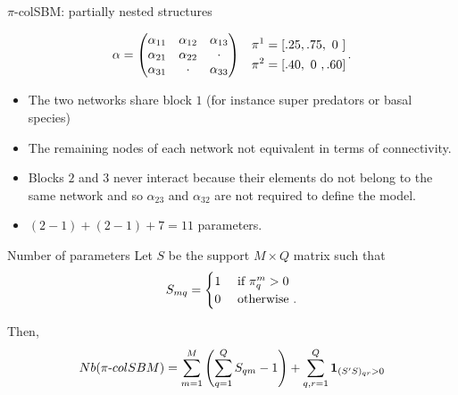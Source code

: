 \documentclass[compress,10pt]{beamer}
\begin{document}
\begin{frame}{$\pi$-colSBM: partially nested structures}

\begin{eqnarray*}
    \alpha = \begin{pmatrix}
      \alpha_{11} & \alpha_{12} & \alpha_{13} \\
      \alpha_{21} & \alpha_{22} & \cdot \\
      \alpha_{31} & \cdot & \alpha_{33}
    \end{pmatrix} & &  \begin{aligned}
                      \pi^{1} = [.25, .75, \text{ }0\text{ }] \\ \pi^{2} = [.40, \text{ }0\text{ }, .60]
                    \end{aligned}\, . 
\end{eqnarray*}
  
\begin{itemize}
 \item The two networks share block $1$ (for instance super predators or basal species)
 \item The remaining nodes of each network not equivalent in terms of connectivity.
 \item Blocks $2$ and $3$ never interact because their elements do not belong to the same network and so $\alpha_{23}$ and $\alpha_{32}$ are not required to define the model.
 \item $(2-1) + (2-1) + 7 = 11$ parameters. 
\end{itemize}
\end{frame}



\begin{frame}{Number of parameters}
Let $S$ be the support   $M\times Q$ matrix such that 
\begin{equation*}\label{eq:support}
  S_{mq} = \begin{cases}
             1 & \text{ if } \pi^{m}_q>0 \\
             0 & \text{ otherwise }.
           \end{cases}
\end{equation*}

Then, 
\begin{equation*}\label{eq:Nbpi}
Nb(\pi\text{-} colSBM) = \sum_{m=1}^M \left(\sum_{q=1}^Q S_{qm}  -1\right)  + \sum_{q,r =1}^{Q} \mathbf{1}_{(S'S)_{qr}>0}
\end{equation*}


\end{frame}
\end{document}
